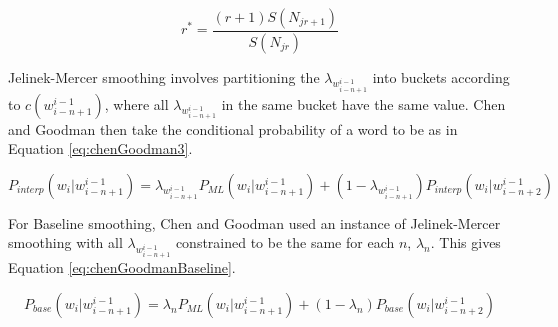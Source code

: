 \begin{equation}
r^{*}=\frac{(r+1)S(N_{jr+1})}{S(N_{jr})}
\label{eq:churchGaleEGT}
\end{equation}

%
Jelinek-Mercer smoothing involves partitioning the $\lambda_{w_{i-n+1}^{i-1}}$ into buckets according to $c(w_{i-n+1}^{i-1})$, where all $\lambda_{w_{i-n+1}^{i-1}}$ in the same bucket have the same value. Chen and Goodman then take the conditional probability of a word to be as in Equation \ref{eq:chenGoodman3}.

\begin{equation}
P_{interp}(w_{i}|w_{i-n+1}^{i-1})=\lambda_{w_{i-n+1}^{i-1}}P_{ML}(w_{i}|w_{i-n+1}^{i-1})+(1-\lambda_{w_{i-n+1}^{i-1}})P_{interp}(w_{i}|w_{i-n+2}^{i-1})
\label{eq:chenGoodman3}
\end{equation}

For Baseline smoothing, Chen and Goodman used an instance of Jelinek-Mercer smoothing with all $\lambda_{w_{i-n+1}^{i-1}}$ constrained to be the same for each $n$, $\lambda_{n}$. This gives Equation \ref{eq:chenGoodmanBaseline}.

\begin{equation}
P_{base}(w_{i}|w_{i-n+1}^{i-1})=\lambda_{n}P_{ML}(w_{i}|w_{i-n+1}^{i-1})+(1-\lambda_{n})P_{base}(w_{i}|w_{i-n+2}^{i-1})
\label{eq:chenGoodmanBaseline}
\end{equation}

